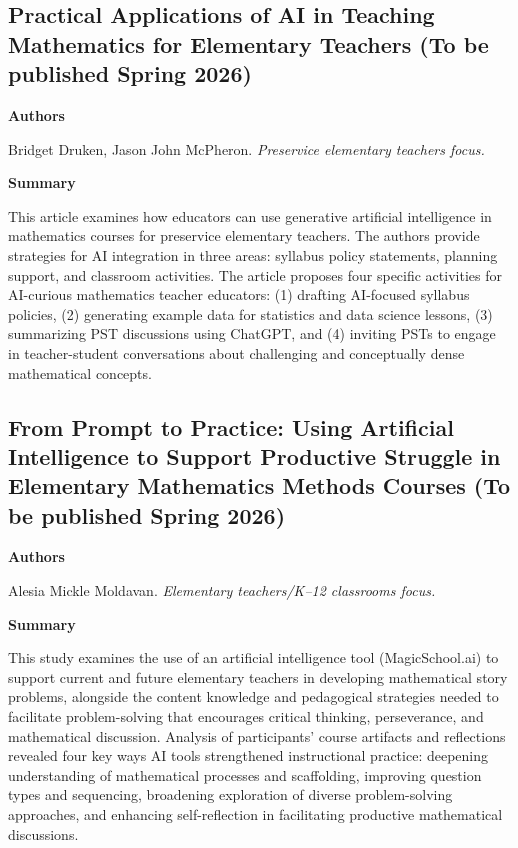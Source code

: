 \documentclass[11pt, a4paper]{article}
\newenvironment{annotation}[1]
{\par\vspace{2pt}\noindent\textbf{#1}\par\vspace{1pt}\noindent\small\ignorespaces}
{\par\vspace{3pt}}
\begin{document}
\subsection[\texorpdfstring{Practical Applications of AI in Teaching Mathematics for Elementary Teachers }{Practical Applications of AI in Teaching Mathematics for Elementary Teachers }]{Practical Applications of AI in Teaching Mathematics for Elementary Teachers (To be published Spring 2026)}

\begin{annotation}{Authors}
Bridget Druken, Jason John McPheron. \textit{Preservice elementary teachers focus.}
\end{annotation}

\begin{annotation}{Summary}
This article examines how educators can use generative artificial intelligence in mathematics courses for preservice elementary teachers. The authors provide strategies for AI integration in three areas: syllabus policy statements, planning support, and classroom activities. The article proposes four specific activities for AI-curious mathematics teacher educators: (1) drafting AI-focused syllabus policies, (2) generating example data for statistics and data science lessons, (3) summarizing PST discussions using ChatGPT, and (4) inviting PSTs to engage in teacher-student conversations about challenging and conceptually dense mathematical concepts.
\end{annotation}


\subsection[\texorpdfstring{From Prompt to Practice: Using Artificial Intelligence to Support Productive Struggle in Elementary Mathematics Methods Courses }{From Prompt to Practice: Using Artificial Intelligence to Support Productive Struggle in Elementary Mathematics Methods Courses }]{From Prompt to Practice: Using Artificial Intelligence to Support Productive Struggle in Elementary Mathematics Methods Courses (To be published Spring 2026)}

\begin{annotation}{Authors}
Alesia Mickle Moldavan. \textit{Elementary teachers/K--12 classrooms focus.}
\end{annotation}

\begin{annotation}{Summary}
This study examines the use of an artificial intelligence tool (MagicSchool.ai) to support current and future elementary teachers in developing mathematical story problems, alongside the content knowledge and pedagogical strategies needed to facilitate problem-solving that encourages critical thinking, perseverance, and mathematical discussion. Analysis of participants' course artifacts and reflections revealed four key ways AI tools strengthened instructional practice: deepening understanding of mathematical processes and scaffolding, improving question types and sequencing, broadening exploration of diverse problem-solving approaches, and enhancing self-reflection in facilitating productive mathematical discussions.
\end{annotation}
\end{document}
